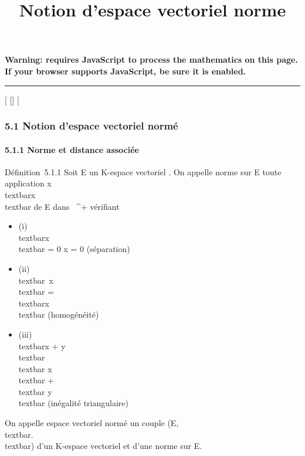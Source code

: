 \documentclass[]{article}
\title{Notion d'espace vectoriel norme}
\author{}
\date{}
\begin{document}
\maketitle

\textbf{Warning: 
requires JavaScript to process the mathematics on this page.\\ If your
browser supports JavaScript, be sure it is enabled.}

\begin{center}\rule{3in}{0.4pt}\end{center}

{[}
{[}{]}
{[}

\subsubsection{5.1 Notion d'espace vectoriel normé}

\paragraph{5.1.1 Norme et distance associée}

Définition~5.1.1 Soit E un K-espace vectoriel . On appelle norme sur E
toute application
x\mapsto~\\textbar{}x\\textbar{}
de E dans ~^+ vérifiant

\begin{itemize}
\itemsep1pt\parskip0pt
\item
  (i) \\textbar{}x\\textbar{} = 0
  \Leftrightarrow x = 0 (séparation)
\item
  (ii) \\textbar{}\lambda~x\\textbar{} =
  \textbar{}\lambda~\textbar{}\\textbar{}x\\textbar{}
  (homogénéité)
\item
  (iii) \\textbar{}x + y\\textbar{}
  \leq\\textbar{} x\\textbar{}
  +\\textbar{} y\\textbar{} (inégalité
  triangulaire)
\end{itemize}

On appelle espace vectoriel normé un couple
(E,\\textbar{}.\\textbar{}) d'un K-espace
vectoriel et d'une norme sur E.
\end{document}
